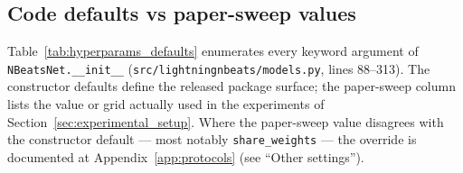 \documentclass[11pt,a4paper]{article}
\begin{document}
\subsection{Code defaults vs paper-sweep values}
\label{app:hyperparams:defaults}

Table~\ref{tab:hyperparams_defaults} enumerates every keyword argument of \texttt{NBeatsNet.\_\_init\_\_} (\texttt{src/lightningnbeats/models.py}, lines 88--313). The constructor defaults define the released package surface; the paper-sweep column lists the value or grid actually used in the experiments of Section~\ref{sec:experimental_setup}. Where the paper-sweep value disagrees with the constructor default --- most notably \texttt{share\_weights} --- the override is documented at Appendix~\ref{app:protocols} (see ``Other settings'').
\end{document}
